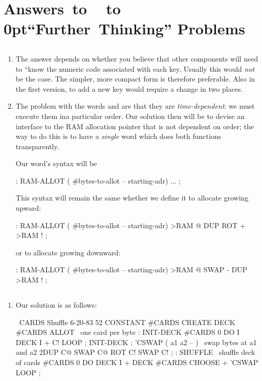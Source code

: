 
\chapter{Answers~to ~ 
\hbox to 0pt{\hss``}Further~Thinking''
Problems}
\section{}
\begin{enumerate}
\item The answer depends on whether you believe that other components will
need to ``know the numeric code associated with each key.  Usually this
would \emph{not} be the case.  The simpler, more compact form is therefore
preferable.  Also in the first version, to add a new key would require a 
change in two places.
\item The problem with the words  and  are that they are 
\emph{time-dependent}:  we must execute them ina particular order.  Our solution
then will be to devise an interface to the RAM allocation pointer that is not
dependent on order; the way to do this is to have a \emph{single} word which does
both functions transparently.

Our word's syntax will be
\begin{Code}
: RAM-ALLOT   ( #bytes-to-allot -- starting-adr) 
    ... ;
\end{Code}
This syntax will remain the same whether we define it to allocate growing 
upward:
\begin{Code}
: RAM-ALLOT  ( #bytes-to-allot -- starting-adr)
    >RAM @  DUP ROT +  >RAM ! ;
\end{Code}
or to allocate growing downward:
\begin{Code}
: RAM-ALLOT  ( #bytes-to-allot -- starting-adr)
    >RAM @  SWAP -  DUP >RAM ! ;
\end{Code}
\end{enumerate}

\section{}
\begin{enumerate}
\item Our solution is as follows:
\begin{Code}
\ CARDS               Shuffle                6-20-83
52 CONSTANT #CARDS
CREATE DECK  #CARDS ALLOT   \   one card per byte
: INIT-DECK
   #CARDS 0 DO  I  DECK I + C!  LOOP ;
INIT-DECK
: 'CSWAP  ( a1 a2 -- )  \  swap bytes at a1 and a2
   2DUP C@  SWAP C@  ROT C!  SWAP C! ;
: SHUFFLE   \  shuffle deck of cards
   #CARDS 0 DO  DECK I +  DECK  #CARDS CHOOSE +
      'CSWAP  LOOP ;
\end{Code}
\end{enumerate}
